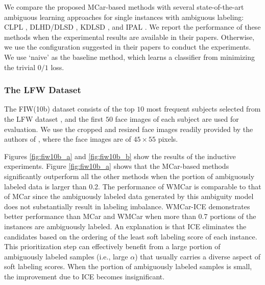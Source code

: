 \documentclass[10pt,journal,compsoc]{IEEEtran}
\begin{document}
We compare the proposed MCar-based methods with several state-of-the-art ambiguous learning approaches for single instances with ambiguous labeling: CLPL \cite{Cour2011}, DLHD/DLSD \cite{Chen2013}, KDLSD \cite{Chen2014all}, and IPAL \cite{Zhang2015stp}. We report the performance of these methods when the experimental results are available in their papers. Otherwise, we use the configuration suggested in their papers to conduct the experiments. We use `naive' \cite{Cour2011} as the baseline method, which learns a classifier from minimizing the trivial $0/1$ loss.




\subsubsection{The LFW Dataset}



The FIW(10b) dataset \cite{Cour2011} consists of the top $10$ most frequent subjects selected from the LFW dataset \cite{Huang2007}, and the first $50$ face images of each subject are used for evaluation.
We use the cropped and resized face images readily provided by the authors of \cite{Cour2011}, where the face images are of $45 \times 55$ pixels.


Figures \ref{fig:fiw10b_a} and \ref{fig:fiw10b_b} show the results of the inductive experiments. Figure \ref{fig:fiw10b_a} shows that the MCar-based methods significantly outperform all the other methods when the portion of ambiguously labeled data is larger than 0.2. The performance of WMCar is comparable to that of MCar since the ambiguously labeled data generated by this ambiguity model does not substantially result in labeling imbalance. WMCar-ICE demonstrates better performance than MCar and WMCar when more than 0.7 portions of the instances are ambiguously labeled.
An explanation is that ICE eliminates the candidates based on the ordering of the least soft labeling score of each instance. This prioritization step can effectively benefit from a large portion of ambiguously labeled samples (i.e., large $\alpha$) that usually carries a diverse aspect of soft labeling scores. When the portion of ambiguously labeled samples is small, the improvement due to ICE becomes insignificant.
\end{document}
